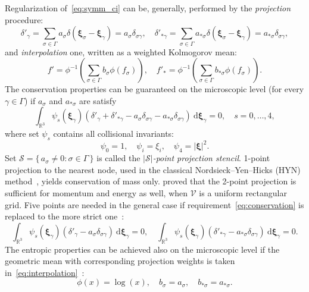 \documentclass{aip-cp}
\newcommand{\dd}{\:\mathrm{d}}
\newcommand{\dxi}{\dd\boldsymbol{\xi}}
\newcommand{\bxi}{\boldsymbol{\xi}}
\newcommand{\Set}[2]{\{\,{#1}:{#2}\,\}}
\begin{document}
Regularization of~\eqref{eq:symm_ci} can be, generally, performed by the \emph{projection} procedure:
\begin{equation}\label{eq:projection}
    \delta'_\gamma = \sum_{\sigma\in\Gamma} a_\sigma \delta(\bxi_\sigma-\bxi_\gamma) = a_\sigma \delta_{\sigma\gamma}, \quad
    \delta'_{*\gamma} = \sum_{\sigma\in\Gamma} a_{*\sigma} \delta(\bxi_\sigma-\bxi_\gamma) = a_{*\sigma} \delta_{\sigma\gamma},
\end{equation}
and \emph{interpolation} one, written as a weighted Kolmogorov mean:
\begin{equation}\label{eq:interpolation}
    f' = \phi^{-1}\left( \sum_{\sigma\in\Gamma} b_\sigma \phi(f_\sigma) \right), \quad
    f'_* = \phi^{-1}\left( \sum_{\sigma\in\Gamma} b_{*\sigma} \phi(f_\sigma) \right).
\end{equation}
The conservation properties can be guaranteed on the microscopic level (for every \(\gamma\in\Gamma\))
if \(a_\sigma\) and \(a_{*\sigma}\) are satisfy
\begin{equation}\label{eq:conservation}
    \int_{\mathbb{R}^3} \psi_s(\bxi_\gamma) \left(
        \delta'_\gamma + \delta'_{*\gamma} - a_\sigma \delta_{\sigma\gamma} - a_{*\sigma} \delta_{\sigma\gamma}
    \right) \dxi_\gamma = 0, \quad s = 0,\dots,4,
\end{equation}
where set \(\psi_s\) contains all collisional invariants:
\begin{equation}\label{eq:invariants}
    \psi_0 = 1, \quad \psi_i = \xi_i, \quad \psi_4 = |\bxi|^2.
\end{equation}
Set \(\mathcal{S} = \Set{a_\sigma\neq0}{\sigma\in\Gamma}\) is called the \emph{\(|\mathcal{S}|\)-point projection stencil}.
1-point projection to the nearest node, used in the classical Nordsieck--Yen--Hicks (HYN) method~\cite{Nordsieck1966, Yen1984},
yields conservation of mass only.
\citet{Tcheremissine1998} proved that the 2-point projection is sufficient for momentum and energy as well,
when \(\mathcal{V}\) is a uniform rectangular grid.
Five points are needed in the general case if requirement~\eqref{eq:conservation} is replaced to the more strict one~\cite{Varghese2007}:
\begin{equation}\label{eq:conservation2}
    \int_{\mathbb{R}^3} \psi_s(\bxi_\gamma) \left( \delta'_\gamma - a_\sigma \delta_{\sigma\gamma} \right) \dxi_\gamma = 0, \quad
    \int_{\mathbb{R}^3} \psi_s(\bxi_\gamma) \left( \delta'_{*\gamma} - a_{*\sigma} \delta_{\sigma\gamma} \right) \dxi_\gamma = 0.
\end{equation}
The entropic properties can be achieved also on the microscopic level
if the geometric mean with corresponding projection weights is taken
in~\eqref{eq:interpolation}~\cite{Tcheremissine2006, Dodulad2013}:
\begin{equation}\label{eq:geometric_mean}
   \phi(x) = \log(x), \quad b_\sigma = a_\sigma, \quad b_{*\sigma} = a_{*\sigma}.
\end{equation}
\end{document}
